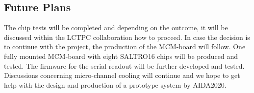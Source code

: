 \subsection{Future Plans}
The chip tests will be completed and depending on the outcome, it will be discussed within the LCTPC collaboration how to proceed. In case the decision is to continue with the project, the production of the MCM-board will follow. One fully mounted MCM-board with eight SALTRO16 chips will be produced and tested. The firmware for the serial readout will be further developed and tested. Discussions concerning micro-channel cooling will continue and we hope to get help with the design and production of a prototype system by AIDA2020.
